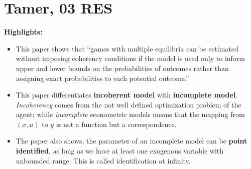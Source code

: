 \documentclass{book}
\theoremstyle{plain}
\theoremstyle{definition}
\newcommand{\mytitle}[1]{{\large{\textbf{#1}}}}
\begin{document}




\section{Tamer, 03 RES} %
\label{sec:tamer_03_res}

\textbf{}

\mytitle{Highlights:}
\begin{itemize}
	\item This paper shows that ``games with multiple equilibria can be estimated without imposing coherency conditions if the model is used only to inform upper and lower bounds on the probabilities of outcomes rather than assigning exact probabilities to each potential outcome.'' \citep{Davis:2006kn}

	\item This paper differentiates \textbf{incoherent model} with \textbf{incomplete model}.
	\textit{Incoherency} comes from the not well defined optimization problem of the agent; while \textit{incomplete} econometric models means that the mapping from $(x,u)$ to $y$ is not a function but a correspondence.

	\item The paper also shows, the parameter of an incomplete model can be \textbf{point identified}, as long as we have at least one exogenous variable with unbounded range. This is called identification at infinity.
\end{itemize}
\end{document}
